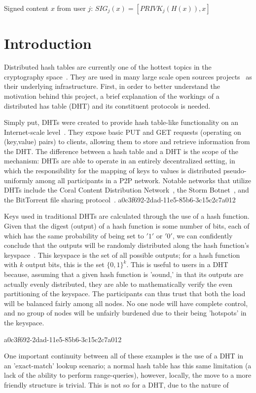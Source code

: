 \documentclass[12pt]{article}
\begin{document}
Signed content $x$ from user $j$: $SIG_j(x) = \left[ PRIVK_j( H(x) ), x \right]$

\section{Introduction}
\par Distributed hash tables are currently one of the hottest topics in the cryptography space~\cite{Stoica:2001dj,Rowstron:2001ea,Ratnasamy:2001wn}. They are used in many large scale open sources projects~\cite{Freitas:2013tb,Xu:2010vs,Perfitt:2010fh} as their underlying infrastructure. First, in order to better understand the motivation behind this project, a brief explanation of the workings of a distributed has table (DHT) and its constituent protocols is needed.

\par Simply put, DHTs were created to provide hash table-like functionality on an Internet-scale level~\cite{Ratnasamy:2001wn}. They expose basic PUT and GET requests (operating on (key,value) pairs) to clients, allowing them to store and retrieve information from the DHT. The difference between a hash table and a DHT is the scope of the mechanism: DHTs are able to operate in an entirely decentralized setting, in which the responsibility for the mapping of keys to values is distributed pseudo-uniformly among all participants in a P2P network. Notable networks that utilize DHTs include the Coral Content Distribution Network~\cite{Freedman:2004vb}, the Storm Botnet~\cite{Holz:2008uk}, and the BitTorrent file sharing protocol~\cite{Cohen:y1_8mBnw}.
a0c3f692-2dad-11e5-85b6-3c15c2c7a012
\par Keys used in traditional DHTs are calculated through the use of a hash function. Given that the digest (output) of a hash function is some number of bits, each of which has the same probability of being set to $'1'$ or $'0'$, we can confidently conclude that the outputs will be randomly distributed along the hash function's keyspace~. This keyspace is the set of all possible outputs; for a hash function with $k$ output bits, this is the set $\{0,1\}^k$. This is useful to users in a DHT because, assuming that a given hash function is 'sound,' in that its outputs are actually evenly distributed, they are able to mathematically verify the even partitioning of the keyspace. The participants can thus trust that both the load will be balanced fairly among all nodes. No one node will have complete control, and no group of nodes will be unfairly burdened due to their being 'hotspots' in the keyspace.~

a0c3f692-2dad-11e5-85b6-3c15c2c7a012\par One important continuity between all of these examples is the use of a DHT in an 'exact-match' lookup scenario; a normal hash table has this same limitation (a lack of the ability to perform range-queries), however, locally, the move to a more friendly structure is trivial. This is not so for a DHT, due to the nature of
\printbibliography
\end{document}
